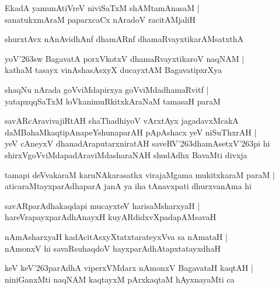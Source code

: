 \begin{shloka}
EkadA yamunAtiVreV niviSaTxM shAMtamAnasaM |\\
sanatukxmAraM paparxcaCx nAradoV racitAMjaliH
\end{shloka}

\begin{shloka}
shurxtAvx nAnAvidhAnf dhamARnf dhamaRvayxtikarAMsatxthA
\end{shloka}

\begin{shloka}
yoV\char'263sw BagavatA porxVkotxV dhamaRvayxtikaroV naqNAM |\\
kathaM tasayx vinAshasAsxyX ducayxtAM BagavatipxrXya
\end{shloka}

\begin{shloka}
shaqNu nArada goVviMdapirxya goVviMdadhamaRvitf |\\
yatapxqqSaTxM loVkanimuRkitxkAraNaM tamasaH paraM
\end{shloka}

\begin{shloka}
savARcAravivajiRtAH shaThadhiyoV vArxtAyx jagadavxMcakA\\
daMBahaMkaqtipAnapeYshunaparAH pApAshacx yeV niSuThxrAH |\\
yeV cAneyxV dhanadAraputarxniratAH saveRV\char'263dhamAsetxV\char'263pi hi\\
shirxVgoVviMdapadAraviMdasharaNAH shudAdhx BavaMti divxja
\end{shloka}

\begin{shloka}
tamapi deVvakaraM karuNAkarasathx virajaMgama mukitxkaraM paraM |\\
aticaraMtayxparAdhaparA janA ya iha tAnavxpati dhurxvanAma hi
\end{shloka}

\begin{shloka}
savARparAdhakaqdapi mucayxteV harisaMsharxyaH |\\
hareVrapayxparAdhAnayxH kuyARdidxvXpadapAMsavaH 
\end{shloka}

\begin{shloka}
nAmAsharxyaH kadAcitAsxyXtatxtarateyxVva sa nAmataH |\\
nAmonxV hi savaRsuhaqdoV hayxparAdhAtapxtatayxdhaH
\end{shloka}

\begin{shloka}
keV keV\char'263parAdhA viperxVMdarx nAmonxV BagavataH kaqtAH |\\
niniGanxMti naqNAM kaqtayxM pArxkaqtaM hAyxnayaMti ca
\end{shloka}

